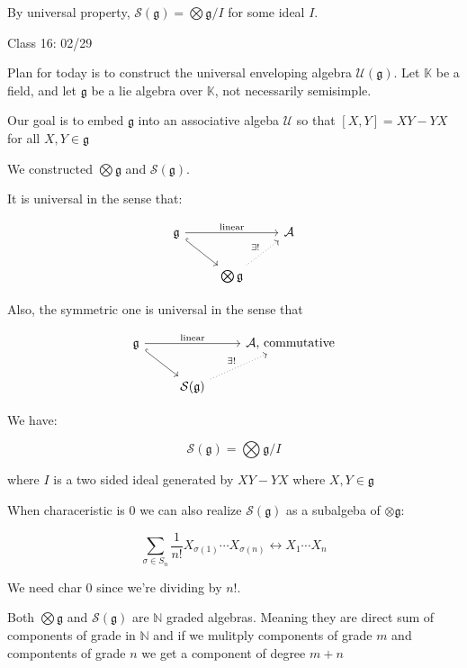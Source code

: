 \documentclass{article}
\theoremstyle{definition}
\begin{document}
By universal property, \(\mathcal{S}(\mathfrak{g} ) = \bigotimes \mathfrak{g} / I  \) for some ideal \(I\). 

\hrulefill

Class 16: 02/29

Plan for today is to construct the universal enveloping algebra \(\mathcal{U} (\mathfrak{g} )\). Let \(\mathbb{K}\) be a field, and let \(\mathfrak{g} \) be a lie algebra over \(\mathbb{K} \), not necessarily semisimple.

Our goal is to embed \(\mathfrak{g} \) into an associative algeba \(\mathcal{U}\) so that \([X,Y]=XY - YX\) for all \(X,Y\in \mathfrak{g} \) 

We constructed \(\bigotimes \mathfrak{g}\) and \(\mathcal{S}(\mathfrak{g})\).

It is universal in the sense that:

\[
    \begin{tikzcd}
        \mathfrak{g} \ar[rd,hook,swap] \ar[rr,"\text{linear}"] & & \mathcal{A}\\
        & \bigotimes \mathfrak{g} \ar[ur,dotted, "\exists !"] 
    \end{tikzcd}
\]

Also, the symmetric one is universal in the sense that

\[
    \begin{tikzcd}
        \mathfrak{g} \ar[rd,hook,swap] \ar[rr,"\text{linear}"] & & \mathcal{A}\text{, commutative}\\
        & \mathcal{S}(\mathfrak{g}) \ar[ur,dotted, "\exists !"] 
    \end{tikzcd}
\]

We have:

\[
    \mathcal{S}(\mathfrak{g}) = \bigotimes \mathfrak{g} / I 
\]

where \(I\) is a two sided ideal generated by \(XY - YX\) where \(X,Y\in \mathfrak{g}\) 

When characeristic is \(0\) we can also realize \(\mathcal{S} (\mathfrak{g} )\) as a subalgeba of \(\otimes \mathfrak{g}\):

\[
    \sum_{\sigma \in S_n}^{} \frac{1}{n!} X_{\sigma(1)}\cdots X_{\sigma(n)} \leftrightarrow X_1\cdots X_n
\]

We need char 0 since we're dividing by \(n!\).

Both \(\bigotimes \mathfrak{g}\) and \(\mathcal{S} (\mathfrak{g} )\) are \(\mathbb{N}\) graded algebras. Meaning they are direct sum of components of grade in \(\mathbb{N}\) and if we mulitply components of grade \(m\) and compontents of grade \(n\) we get a component of degree \(m+n\) 
\end{document}
